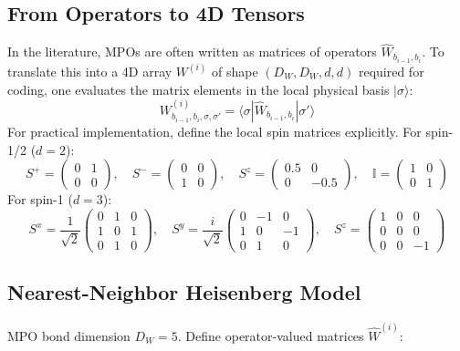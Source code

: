 \documentclass[aps,prb,onecolumn,scriptaddress]{revtex4-2}
\newcommand{\ket}[1]{|#1\rangle}
\newcommand{\bra}[1]{\langle#1|}
\newcommand{\Id}{\mathbb{I}}
\begin{document}
	\subsection{From Operators to 4D Tensors}
	\label{sec:mpo_theory}
	In the literature, MPOs are often written as matrices of operators $\hat{W}_{b_{i-1}, b_i}$. To translate this into a 4D array $W^{(i)}$ of shape $(D_W, D_W, d, d)$ required for coding, one evaluates the matrix elements in the local physical basis $\ket{\sigma}$:
	\begin{equation}
		W^{(i)}_{b_{i-1}, b_i, \sigma, \sigma'} = \bra{\sigma} \hat{W}_{b_{i-1}, b_i} \ket{\sigma'}
	\end{equation}
	For practical implementation, define the local spin matrices explicitly. For spin-1/2 ($d=2$):
	\begin{equation}
		S^+ = \begin{pmatrix} 0 & 1 \\ 0 & 0 \end{pmatrix}, \quad 
		S^- = \begin{pmatrix} 0 & 0 \\ 1 & 0 \end{pmatrix}, \quad 
		S^z = \begin{pmatrix} 0.5 & 0 \\ 0 & -0.5 \end{pmatrix}, \quad 
		\Id = \begin{pmatrix} 1 & 0 \\ 0 & 1 \end{pmatrix}
	\end{equation}
	For spin-1 ($d=3$):
	\begin{equation}
		S^x = \frac{1}{\sqrt{2}} \begin{pmatrix} 0 & 1 & 0 \\ 1 & 0 & 1 \\ 0 & 1 & 0 \end{pmatrix}, \quad 
		S^y = \frac{i}{\sqrt{2}} \begin{pmatrix} 0 & -1 & 0 \\ 1 & 0 & -1 \\ 0 & 1 & 0 \end{pmatrix}, \quad 
		S^z = \begin{pmatrix} 1 & 0 & 0 \\ 0 & 0 & 0 \\ 0 & 0 & -1 \end{pmatrix}
	\end{equation}
	
	\subsection{Nearest-Neighbor Heisenberg Model}
	\label{sec:mpo_heis}
	MPO bond dimension $D_W = 5$. Define operator-valued matrices $\hat{W}^{(i)}$:
	
\end{document}
